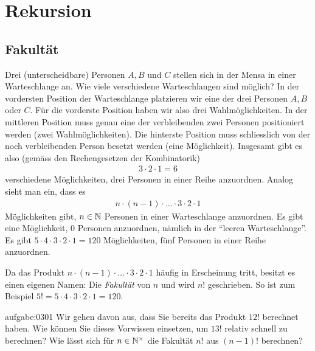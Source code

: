 \chapter{Rekursion}\label{ch:Kapitel03}

\section{Fakultät}\label{sec:fakultaet}
Drei (unterscheidbare) Personen $A, B$ und $C$ stellen sich in der Mensa in einer Warteschlange an. Wie viele verschiedene Warteschlangen sind möglich? In der vordersten Position der Warteschlange platzieren wir eine der drei Personen $A, B$ oder $C$. Für die vorderste Position haben wir also drei Wahlmöglichkeiten. In der mittleren Position muss genau eine der verbleibenden zwei Personen positioniert werden (zwei Wahlmöglichkeiten). Die hinterste Position muss schliesslich von der noch verbleibenden Person besetzt werden (eine Möglichkeit). Insgesamt gibt es also (gemäss den Rechengesetzen der Kombinatorik)
\begin{align*}
    3\cdot 2\cdot 1 = 6
\end{align*}
verschiedene Möglichkeiten, drei Personen in einer Reihe anzuordnen. Analog sieht man ein, dass es
\begin{align*}
    n\cdot (n-1)\cdot\ldots\cdot 3\cdot 2\cdot 1
\end{align*}
Möglichkeiten gibt, $n\in\mathbb{N}$ Personen in einer Warteschlange anzuordnen. Es gibt eine Möglichkeit, $0$ Personen anzuordnen, nämlich in der \enquote{leeren Warteschlange}.
\beispiel{-}
{Es gibt $5\cdot 4\cdot 3\cdot 2\cdot 1 = 120$ Möglichkeiten, fünf Personen in einer Reihe anzuordnen.}

\noindent
Da das Produkt $n\cdot (n-1)\cdot\ldots\cdot 3\cdot 2\cdot 1$ häufig in Erscheinung tritt, besitzt es einen eigenen Namen: Die \textit{Fakultät} von $n$ und wird $n!$ geschrieben. So ist zum Beispiel $5! = 5\cdot 4\cdot 3\cdot 2\cdot 1 = 120$.

\begin{aufgabe}{aufgabe:0301}
Wir gehen davon aus, dass Sie bereits das Produkt $12!$  berechnet haben. Wie können Sie dieses Vorwissen einsetzen, um $13!$ relativ schnell zu berechnen? Wie lässt sich für $n\in\mathbb{N}^{\times}$ die Fakultät $n!$ aus $(n-1)!$ berechnen?
\end{aufgabe}

